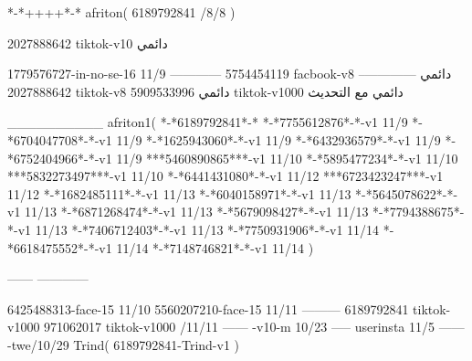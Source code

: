 *-*++++*-*
afriton(
6189792841 /8/8
)

2027888642 tiktok-v10
دائمي

1779576727-in-no-se-16 11/9
------------
5754454119 facbook-v8
دائمي
--------------
2027888642 tiktok-v8
دائمي
5909533996 tiktok-v1000
دائمي مع التحديث

__________
afriton1(
*-*6189792841*-*
*-*7755612876*-*-v1 11/9
*-*6704047708*-*-v1 11/9
*-*1625943060*-*-v1 11/9
*-*6432936579*-*-v1 11/9
*-*6752404966*-*-v1 11/9
***5460890865***-v1 11/10
*-*5895477234*-*-v1 11/10
***5832273497***-v1 11/10
*-*6441431080*-*-v1 11/12
***6723423247***-v1 11/12
*-*1682485111*-*-v1 11/13
*-*6040158971*-*-v1 11/13
*-*5645078622*-*-v1 11/13
*-*6871268474*-*-v1 11/13
*-*5679098427*-*-v1 11/13
*-*7794388675*-*-v1 11/13
*-*7406712403*-*-v1 11/13
*-*7750931906*-*-v1 11/14
*-*6618475552*-*-v1 11/14
*-*7148746821*-*-v1 11/14
)

------
------------

6425488313-face-15 11/10
5560207210-face-15 11/11
---------
6189792841 tiktok-v1000
971062017 tiktok-v1000 /11/11
------
-v10-m 10/23
-----
userinsta 11/5
------
-twe/10/29
Trind(
6189792841-Trind-v1 
)
